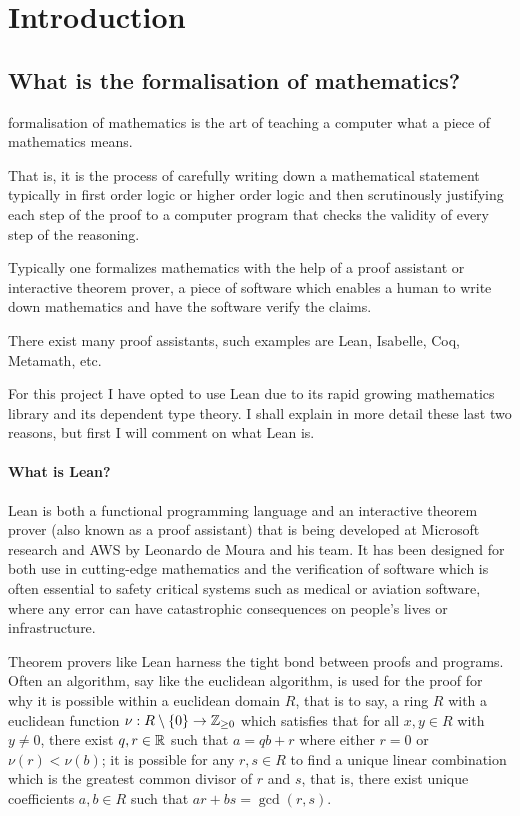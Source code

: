 \chapter{Introduction}\label{Ch2_Introduction}

\section{What is the formalisation of mathematics?}

formalisation of mathematics is the art of teaching a computer what a piece of mathematics means.

That is, it is the process of carefully writing down a mathematical statement typically in first order logic or higher order logic and then scrutinously justifying each step of the proof to a computer program that checks the validity of every step of the reasoning. 

Typically one formalizes mathematics with the help of a proof assistant or interactive theorem prover, a piece of software which enables a human to write down mathematics and have the software verify the claims.

There exist many proof assistants, such examples are Lean, Isabelle, Coq, Metamath, etc.

For this project I have opted to use Lean due to its rapid growing mathematics library and its dependent type theory. I shall explain in more detail these last two reasons, but first I will comment on what Lean is.

\subsubsection{What is Lean?}

Lean is both a functional programming language and an interactive theorem prover (also known as a proof assistant) that is being developed at Microsoft research and AWS by Leonardo de Moura and his team.
It has been designed for both use in cutting-edge mathematics and the verification of software which is often essential to safety critical systems such as medical or aviation software, where any error can have
catastrophic consequences on people's lives or infrastructure.

Theorem provers like Lean harness the tight bond between proofs and programs. Often an algorithm, say like the euclidean algorithm, is used for the proof for why it is possible within a euclidean domain
$R$, that is to say, a ring $R$ with a euclidean function $\nu : R \setminus \{0\} \rightarrow \mathbb{Z}_{\geq 0}$ which satisfies that for all $x, y \in R$ with $y \ne 0$, there exist $q, r \in \mathbb{R}$ such that $a  = qb + r$ where either $r = 0$ or $\nu(r) < \nu(b)$;
it is possible for any $r,s \in R$ to find a unique linear combination which is the greatest common divisor of $r$ and $s$, that is, there exist unique coefficients $a, b \in R$ such that $ar + bs = \gcd(r, s)$.


